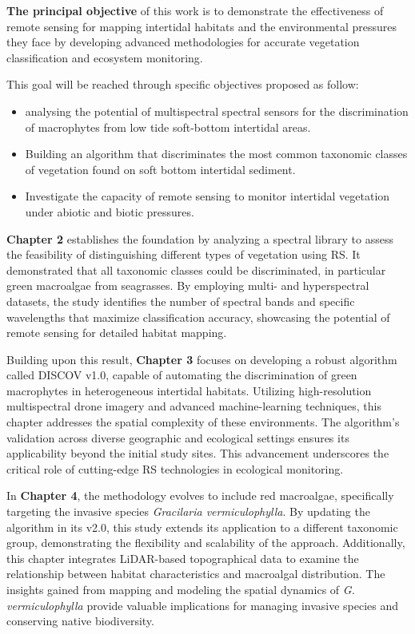 \documentclass[
  letterpaper,
  11pt,
  english,
  singlespacing,
  headsepline]{MastersDoctoralThesis}
\begin{document}
\begin{spacing}{1.5}
\textbf{The principal objective} of this work is to demonstrate the
effectiveness of remote sensing for mapping intertidal habitats and the
environmental pressures they face by developing advanced methodologies
for accurate vegetation classification and ecosystem monitoring.

This goal will be reached through specific objectives proposed as
follow:

\begin{itemize}
\item
  analysing the potential of multispectral spectral sensors for the
  discrimination of macrophytes from low tide soft-bottom intertidal
  areas.
\item
  Building an algorithm that discriminates the most common taxonomic
  classes of vegetation found on soft bottom intertidal sediment.
\item
  Investigate the capacity of remote sensing to monitor intertidal
  vegetation under abiotic and biotic pressures.
\end{itemize}

\textbf{Chapter 2} establishes the foundation by analyzing a spectral
library to assess the feasibility of distinguishing different types of
vegetation using RS. It demonstrated that all taxonomic classes could be
discriminated, in particular green macroalgae from seagrasses. By
employing multi- and hyperspectral datasets, the study identifies the
number of spectral bands and specific wavelengths that maximize
classification accuracy, showcasing the potential of remote sensing for
detailed habitat mapping.

Building upon this result, \textbf{Chapter 3} focuses on developing a
robust algorithm called DISCOV v1.0, capable of automating the
discrimination of green macrophytes in heterogeneous intertidal
habitats. Utilizing high-resolution multispectral drone imagery and
advanced machine-learning techniques, this chapter addresses the spatial
complexity of these environments. The algorithm's validation across
diverse geographic and ecological settings ensures its applicability
beyond the initial study sites. This advancement underscores the
critical role of cutting-edge RS technologies in ecological monitoring.

In \textbf{Chapter 4}, the methodology evolves to include red
macroalgae, specifically targeting the invasive species \emph{Gracilaria
vermiculophylla}. By updating the algorithm in its v2.0, this study
extends its application to a different taxonomic group, demonstrating
the flexibility and scalability of the approach. Additionally, this
chapter integrates LiDAR-based topographical data to examine the
relationship between habitat characteristics and macroalgal
distribution. The insights gained from mapping and modeling the spatial
dynamics of \emph{G. vermiculophylla} provide valuable implications for
managing invasive species and conserving native biodiversity.


\end{spacing}
\end{document}
